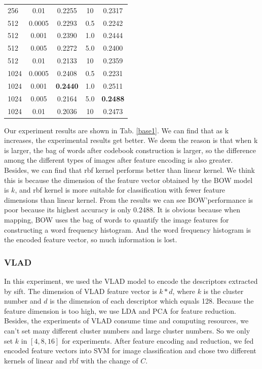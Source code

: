 \documentclass[conference]{IEEEtran}
\begin{document}
\begin{table}[htbp]
\begin{tabular}{@{}p{1cm}<{\centering}|c|c|c|c}
		256   & 0.01  & 0.2255 & 10 & 0.2317\\
		512   & 0.0005  & 0.2293 & 0.5 & 0.2242\\
		512   & 0.001  & 0.2390 & 1.0 & 0.2444\\
		512   & 0.005  & 0.2272 & 5.0 & 0.2400\\
		512   & 0.01  & 0.2133 & 10 & 0.2359\\
		1024   & 0.0005  & 0.2408 & 0.5 & 0.2231\\
		1024   & 0.001  & \textbf{0.2440} & 1.0 & 0.2511\\
		1024   & 0.005  & 0.2164 & 5.0 & \textbf{0.2488}\\
		1024   & 0.01  & 0.2036 & 10 & 0.2473\\
		\hline
	\end{tabular}
\end{table}

Our experiment results are shown in Tab. \ref{base1}. We can find that as k increases, the experimental results get better. We deem the reason is that when k is larger, the bag of words after codebook construction is larger, so the difference among the different types of images after feature encoding is also greater. Besides, we can find that rbf kernel performs better than linear kernel. We think this is because the dimension of the feature vector obtained by the BOW model is $k$, and rbf kernel is more suitable for classification with fewer feature dimensions than linear kernel. From the results we can see BOW'performance is poor because its highest accuracy is only $0.2488$. It is obvious because when mapping, BOW uses the  bag of words to quantify the image features for constructing a word frequency histogram. And the word frequency histogram is the encoded feature vector, so much information is lost.
\subsubsection{VLAD}
In this experiment, we used the VLAD model to encode the descriptors extracted by sift. The dimension of VLAD feature vector is $k*d$, where $k$ is the cluster number and $d$ is the dimension of each descriptor which equals 128. Because the feature dimension is too high, we use LDA and PCA for feature reduction. Besides, the experiments of VLAD consume time and computing resources, we can't set many different cluster numbers and large cluster numbers. So we only set $k$ in $[4,8,16]$ for experiments. After feature encoding and reduction, we fed encoded feature vectors into SVM for image classification and chose two different kernels of linear and rbf with the change of $C$.
\end{document}
